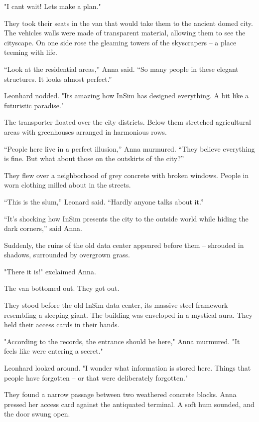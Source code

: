 \documentclass[
]{article}
\begin{document}
"I can\textquotesingle t wait! Let\textquotesingle s make a plan."

They took their seats in the van that would take them to the ancient domed city. The vehicle\textquotesingle s walls were made of transparent material, allowing them to see the cityscape. On one side rose the gleaming towers of the skyscrapers -- a place teeming with life.

``Look at the residential areas,'' Anna said. ``So many people in these elegant structures. It looks almost perfect.''

Leonhard nodded. "It\textquotesingle s amazing how InSim has designed everything. A bit like a futuristic paradise."

The transporter floated over the city districts. Below them stretched agricultural areas with greenhouses arranged in harmonious rows.

``People here live in a perfect illusion,'' Anna murmured. ``They believe everything is fine. But what about those on the outskirts of the city?''

They flew over a neighborhood of grey concrete with broken windows. People in worn clothing milled about in the streets.

``This is the slum,'' Leonard said. ``Hardly anyone talks about it.''

``It's shocking how InSim presents the city to the outside world while hiding the dark corners,'' said Anna.

Suddenly, the ruins of the old data center appeared before them -- shrouded in shadows, surrounded by overgrown grass.

"There it is!" exclaimed Anna.

The van bottomed out. They got out.

They stood before the old InSim data center, its massive steel framework resembling a sleeping giant. The building was enveloped in a mystical aura. They held their access cards in their hands.

"According to the records, the entrance should be here," Anna murmured. "It feels like we\textquotesingle re entering a secret."

Leonhard looked around. "I wonder what information is stored here. Things that people have forgotten -- or that were deliberately forgotten."

They found a narrow passage between two weathered concrete blocks. Anna pressed her access card against the antiquated terminal. A soft hum sounded, and the door swung open.
\end{document}
